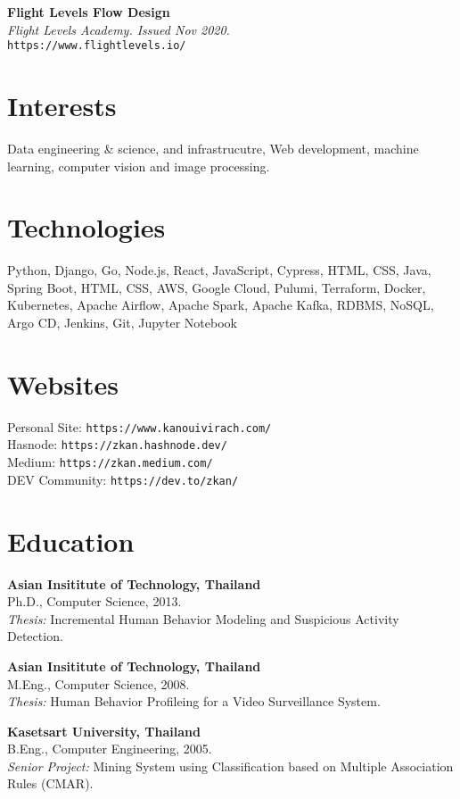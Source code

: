 \documentclass[margin, 10pt]{res}
\begin{document}
\begin{resume}
{\bf Flight Levels Flow Design}\\
{\it \small Flight Levels Academy. Issued Nov 2020.}\\
{\tt https://www.flightlevels.io/}

\section{Interests}

Data engineering \& science, and infrastrucutre, Web development,
machine learning, computer vision and image processing.

\section{Technologies}

Python, Django, Go, Node.js, React, JavaScript, Cypress, HTML, CSS,
Java, Spring Boot, HTML, CSS, AWS, Google Cloud, Pulumi, Terraform,
Docker, Kubernetes, Apache Airflow, Apache Spark, Apache Kafka, RDBMS, NoSQL,
Argo CD, Jenkins, Git, Jupyter Notebook

\section{Websites}

Personal Site: {\tt https://www.kanouivirach.com/}\\
Hasnode: {\tt https://zkan.hashnode.dev/}\\
Medium: {\tt https://zkan.medium.com/}\\
DEV Community: {\tt https://dev.to/zkan/}\\

\section{Education}

{\bf Asian Insititute of Technology, Thailand} \\
Ph.D., Computer Science, 2013. \\
{\it Thesis:} Incremental Human Behavior Modeling and Suspicious Activity
Detection.

{\bf Asian Insititute of Technology, Thailand} \\
M.Eng., Computer Science, 2008. \\
{\it Thesis:} Human Behavior Profileing for a Video Surveillance System.

{\bf Kasetsart University, Thailand} \\
B.Eng., Computer Engineering, 2005. \\
{\it Senior Project:} Mining System using Classification based on Multiple
Association Rules (CMAR).


\end{resume}
\end{document}
